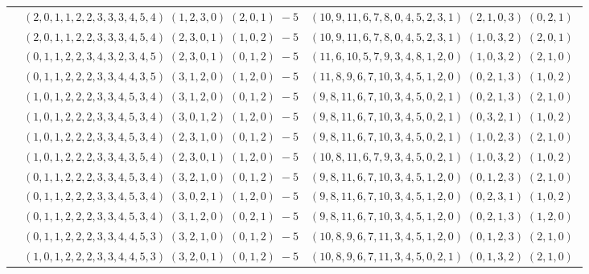 \documentclass[11pt]{article}
\begin{document}
\begin{longtable}[l]{|c|c|c|}
 \cline{2-3} 
 & $(2 ,0 ,1 ,1 ,2 ,2 ,3 ,3 ,3 ,4 ,5 ,4) \;(1 ,2 ,3 ,0) \;(2 ,0 ,1) \;-5$ & $(10 ,9 ,11 ,6 ,7 ,8 ,0 ,4 ,5 ,2 ,3 ,1) \;(2 ,1 ,0 ,3) \;(0 ,2 ,1) \;$\\ 
 \cline{2-3} 
 & $(2 ,0 ,1 ,1 ,2 ,2 ,3 ,3 ,3 ,4 ,5 ,4) \;(2 ,3 ,0 ,1) \;(1 ,0 ,2) \;-5$ & $(10 ,9 ,11 ,6 ,7 ,8 ,0 ,4 ,5 ,2 ,3 ,1) \;(1 ,0 ,3 ,2) \;(2 ,0 ,1) \;$\\ 
 \cline{2-3} 
 & $(0 ,1 ,1 ,2 ,2 ,3 ,4 ,3 ,2 ,3 ,4 ,5) \;(2 ,3 ,0 ,1) \;(0 ,1 ,2) \;-5$ & $(11 ,6 ,10 ,5 ,7 ,9 ,3 ,4 ,8 ,1 ,2 ,0) \;(1 ,0 ,3 ,2) \;(2 ,1 ,0) \;$\\ 
 \cline{2-3} 
 & $(0 ,1 ,1 ,2 ,2 ,2 ,3 ,3 ,4 ,4 ,3 ,5) \;(3 ,1 ,2 ,0) \;(1 ,2 ,0) \;-5$ & $(11 ,8 ,9 ,6 ,7 ,10 ,3 ,4 ,5 ,1 ,2 ,0) \;(0 ,2 ,1 ,3) \;(1 ,0 ,2) \;$\\ 
 \cline{2-3} 
 & $(1 ,0 ,1 ,2 ,2 ,2 ,3 ,3 ,4 ,5 ,3 ,4) \;(3 ,1 ,2 ,0) \;(0 ,1 ,2) \;-5$ & $(9 ,8 ,11 ,6 ,7 ,10 ,3 ,4 ,5 ,0 ,2 ,1) \;(0 ,2 ,1 ,3) \;(2 ,1 ,0) \;$\\ 
 \cline{2-3} 
 & $(1 ,0 ,1 ,2 ,2 ,2 ,3 ,3 ,4 ,5 ,3 ,4) \;(3 ,0 ,1 ,2) \;(1 ,2 ,0) \;-5$ & $(9 ,8 ,11 ,6 ,7 ,10 ,3 ,4 ,5 ,0 ,2 ,1) \;(0 ,3 ,2 ,1) \;(1 ,0 ,2) \;$\\ 
 \cline{2-3} 
 & $(1 ,0 ,1 ,2 ,2 ,2 ,3 ,3 ,4 ,5 ,3 ,4) \;(2 ,3 ,1 ,0) \;(0 ,1 ,2) \;-5$ & $(9 ,8 ,11 ,6 ,7 ,10 ,3 ,4 ,5 ,0 ,2 ,1) \;(1 ,0 ,2 ,3) \;(2 ,1 ,0) \;$\\ 
 \cline{2-3} 
 & $(1 ,0 ,1 ,2 ,2 ,2 ,3 ,3 ,4 ,3 ,5 ,4) \;(2 ,3 ,0 ,1) \;(1 ,2 ,0) \;-5$ & $(10 ,8 ,11 ,6 ,7 ,9 ,3 ,4 ,5 ,0 ,2 ,1) \;(1 ,0 ,3 ,2) \;(1 ,0 ,2) \;$\\ 
 \cline{2-3} 
 & $(0 ,1 ,1 ,2 ,2 ,2 ,3 ,3 ,4 ,5 ,3 ,4) \;(3 ,2 ,1 ,0) \;(0 ,1 ,2) \;-5$ & $(9 ,8 ,11 ,6 ,7 ,10 ,3 ,4 ,5 ,1 ,2 ,0) \;(0 ,1 ,2 ,3) \;(2 ,1 ,0) \;$\\ 
 \cline{2-3} 
 & $(0 ,1 ,1 ,2 ,2 ,2 ,3 ,3 ,4 ,5 ,3 ,4) \;(3 ,0 ,2 ,1) \;(1 ,2 ,0) \;-5$ & $(9 ,8 ,11 ,6 ,7 ,10 ,3 ,4 ,5 ,1 ,2 ,0) \;(0 ,2 ,3 ,1) \;(1 ,0 ,2) \;$\\ 
 \cline{2-3} 
 & $(0 ,1 ,1 ,2 ,2 ,2 ,3 ,3 ,4 ,5 ,3 ,4) \;(3 ,1 ,2 ,0) \;(0 ,2 ,1) \;-5$ & $(9 ,8 ,11 ,6 ,7 ,10 ,3 ,4 ,5 ,1 ,2 ,0) \;(0 ,2 ,1 ,3) \;(1 ,2 ,0) \;$\\ 
 \cline{2-3} 
 & $(0 ,1 ,1 ,2 ,2 ,2 ,3 ,3 ,4 ,4 ,5 ,3) \;(3 ,2 ,1 ,0) \;(0 ,1 ,2) \;-5$ & $(10 ,8 ,9 ,6 ,7 ,11 ,3 ,4 ,5 ,1 ,2 ,0) \;(0 ,1 ,2 ,3) \;(2 ,1 ,0) \;$\\ 
 \cline{2-3} 
 & $(1 ,0 ,1 ,2 ,2 ,2 ,3 ,3 ,4 ,4 ,5 ,3) \;(3 ,2 ,0 ,1) \;(0 ,1 ,2) \;-5$ & $(10 ,8 ,9 ,6 ,7 ,11 ,3 ,4 ,5 ,0 ,2 ,1) \;(0 ,1 ,3 ,2) \;(2 ,1 ,0) \;$\\ 

\end{longtable}
\end{document}
